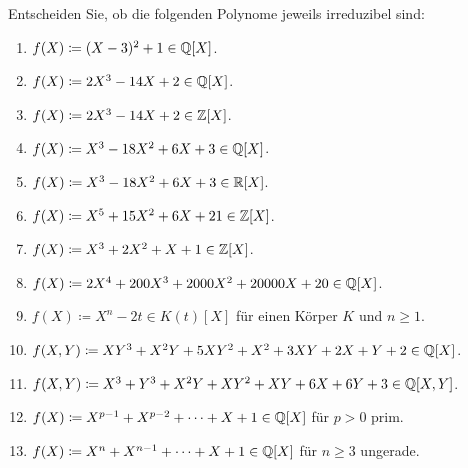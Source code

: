 \begin{question}
  Entscheiden Sie, ob die folgenden Polynome jeweils irreduzibel sind:
  \begin{enumerate}
    \item
      $f(X) \coloneqq (X - 3)^2 + 1 \in \mathbb{Q}[X]$.
    \item
      $f(X) \coloneqq 2X^3 - 14X + 2 \in \mathbb{Q}[X]$.
    \item
      $f(X) \coloneqq 2X^3 - 14X + 2 \in \mathbb{Z}[X]$.
    \item
      $f(X) \coloneqq X^3 - 18 X^2 + 6 X + 3 \in \mathbb{Q}[X]$.
    \item
      $f(X) \coloneqq X^3 - 18 X^2 + 6 X + 3 \in \mathbb{R}[X]$.
    \item
      $f(X) \coloneqq X^5 + 15 X^2 + 6 X + 21 \in \mathbb{Z}[X]$.
    \item
      $f(X) \coloneqq X^3 + 2 X^2 + X + 1 \in \mathbb{Z}[X]$.
    \item
      $f(X) \coloneqq 2X^4 + 200 X^3 + 2000 X^2 + 20000 X + 20 \in \mathbb{Q}[X]$.
    \item
      $f(X) \coloneqq  X^n - 2t \in K(t)[X]$ für einen Körper $K$ und $n \geq 1$.
    \item
      $f(X,Y) \coloneqq X Y^3 + X^2 Y + 5 X Y^2 + X^2 + 3 X Y + 2 X + Y + 2 \in \mathbb{Q}[X]$.
    \item
      $f(X,Y) \coloneqq X^3 + Y^3 + X^2 Y + X Y^2 + XY + 6 X + 6 Y + 3 \in \mathbb{Q}[X,Y]$.
    \item
      $f(X) \coloneqq X^{p-1} + X^{p-2} + \dotsb + X + 1 \in \mathbb{Q}[X]$ für $p > 0$ prim.
    \item
      $f(X) \coloneqq X^n + X^{n-1} + \dotsb + X + 1 \in \mathbb{Q}[X]$ für $n \geq 3$ ungerade.
  \end{enumerate}
\end{question}


